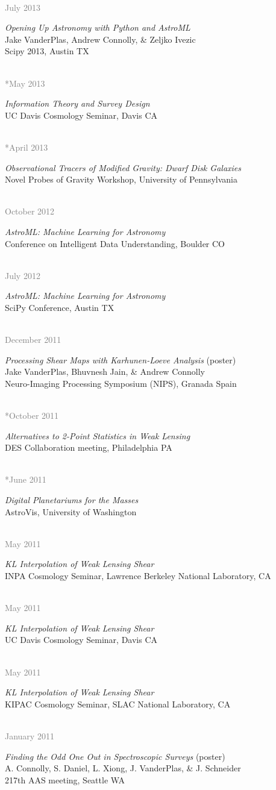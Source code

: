 \documentclass{article} %
\newlength\sidebarwidth
\newcommand{\dateonly}[2][]
	 {\begin{minipage}{\textwidth}
	 \vspace*{.4\baselineskip}
         \nopagebreak\hspace{0in}%
         \nopagebreak\begin{minipage}[t]{\sidebarwidth - .2cm}
         \raggedleft {~}
         {\\[-\baselineskip] \textcolor{gray}{\footnotesize #1}}
	 \end{minipage}%
	 \hfill
	 \begin{minipage}[t]{\linewidth - \sidebarwidth}
	 #2%
	 \end{minipage}%
	 \vspace*{.2\baselineskip plus 1\baselineskip minus
	 .2\baselineskip}%
	 \end{minipage}}
\begin{document}
  \dateonly[July 2013]{
    {\it Opening Up Astronomy with Python and AstroML}\\
    Jake VanderPlas, Andrew Connolly, \& Zeljko Ivezic\\
    Scipy 2013, Austin TX
  }

  \dateonly[**May 2013]{
    {\it Information Theory and Survey Design}\\
    UC Davis Cosmology Seminar, Davis CA
  }

  \dateonly[**April 2013]{
    {\it Observational Tracers of Modified Gravity: Dwarf Disk Galaxies}\\
    Novel Probes of Gravity Workshop, University of Pennsylvania
  }

  \dateonly[October 2012]{
    {\it AstroML: Machine Learning for Astronomy}\\
    Conference on Intelligent Data Understanding, Boulder CO
  }

  \dateonly[July 2012]{
    {\it AstroML: Machine Learning for Astronomy}\\
    SciPy Conference, Austin TX
  }

  \dateonly[December 2011]{
    {\it Processing Shear Maps with Karhunen-Loeve Analysis} (poster)\\
    Jake VanderPlas, Bhuvnesh Jain, \& Andrew Connolly\\
    Neuro-Imaging Processing Symposium (NIPS), Granada Spain
  }

  \dateonly[**October 2011]{
    {\it Alternatives to 2-Point Statistics in Weak Lensing}\\
    DES Collaboration meeting, Philadelphia PA
  }

  \dateonly[**June 2011]{
    {\it Digital Planetariums for the Masses}\\
    AstroVis, University of Washington
  }

  \dateonly[May 2011]{
    {\it KL Interpolation of Weak Lensing Shear}\\
    INPA Cosmology Seminar, Lawrence Berkeley National Laboratory, CA
  }

  \dateonly[May 2011]{
    {\it KL Interpolation of Weak Lensing Shear}\\
    UC Davis Cosmology Seminar, Davis CA
  }

  \dateonly[May 2011]{
    {\it KL Interpolation of Weak Lensing Shear}\\
    KIPAC Cosmology Seminar, SLAC National Laboratory, CA
  }

  \dateonly[January 2011]{
    {\it Finding the Odd One Out in Spectroscopic Surveys} (poster)\\
    A. Connolly, S. Daniel, L. Xiong, J. VanderPlas, \& J. Schneider\\
    217th AAS meeting, Seattle WA
  }
\end{document}
